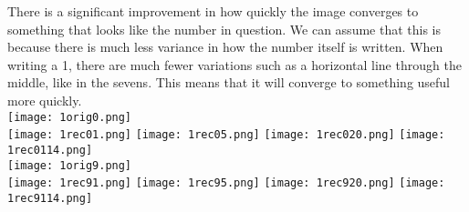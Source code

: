 There is a significant improvement in how quickly the image converges to something that looks like the number in question. We can assume that this is because there is much less variance in how the number itself is written. When writing a 1, there are much fewer variations such as a horizontal line through the middle, like in the sevens. This means that it will converge to something useful more quickly.\\
\texttt{[image: 1orig0.png]}\\
\texttt{[image: 1rec01.png]}
\texttt{[image: 1rec05.png]}
\texttt{[image: 1rec020.png]}
\texttt{[image: 1rec0114.png]}\\
\texttt{[image: 1orig9.png]}\\
\texttt{[image: 1rec91.png]}
\texttt{[image: 1rec95.png]}
\texttt{[image: 1rec920.png]}
\texttt{[image: 1rec9114.png]}\\